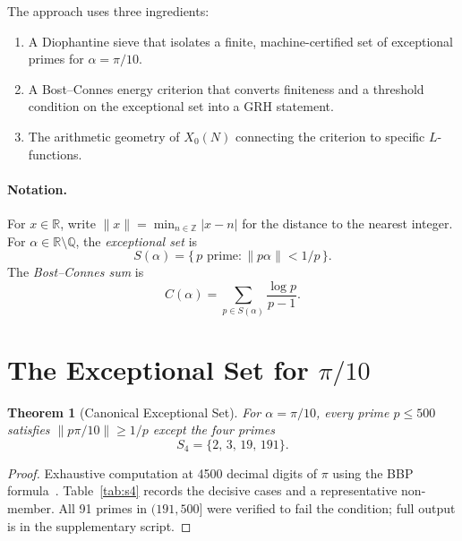 \documentclass[11pt,letterpaper]{article}
\newtheorem{theorem}{Theorem}[section]
\theoremstyle{definition}
\begin{document}
The approach uses three ingredients:
\begin{enumerate}
\item A Diophantine sieve that isolates a finite, machine-certified set of exceptional
      primes for $\alpha = \pi/10$.
\item A Bost--Connes energy criterion that converts finiteness and a threshold condition
      on the exceptional set into a GRH statement.
\item The arithmetic geometry of $X_0(N)$ connecting the criterion to specific $L$-functions.
\end{enumerate}

\paragraph{Notation.}
For $x \in \mathbb{R}$, write $\|x\| = \min_{n \in \mathbb{Z}} |x-n|$ for the distance
to the nearest integer.  For $\alpha \in \mathbb{R} \setminus \mathbb{Q}$, the
\emph{exceptional set} is
\[
  S(\alpha) = \{\,p \text{ prime} : \|p\alpha\| < 1/p\,\}.
\]
The \emph{Bost--Connes sum} is
\[
  C(\alpha) = \sum_{p \in S(\alpha)} \frac{\log p}{p-1}.
\]

\section{The Exceptional Set for $\pi/10$}

\begin{theorem}[Canonical Exceptional Set]\label{thm:canon}
For $\alpha = \pi/10$, every prime $p \leq 500$ satisfies $\|p\pi/10\| \geq 1/p$
except the four primes
\[
  S_4 = \{2,\,3,\,19,\,191\}.
\]
\end{theorem}
\begin{proof}
Exhaustive computation at 4500 decimal digits of $\pi$ using the BBP formula~\cite{BBP97}.
Table~\ref{tab:s4} records the decisive cases and a representative non-member.
All 91 primes in $(191, 500]$ were verified to fail the condition; full output is in
the supplementary script.
\end{proof}
\end{document}
